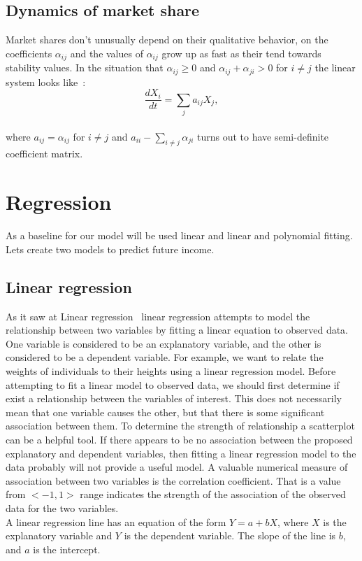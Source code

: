 \subsection{Dynamics of market share} \label{subsec:marketshare}
Market shares don't unusually depend on their qualitative behavior, on the coefficients $\alpha_{ij}$ and the values
of $\alpha_{ij}$ grow up as fast as their tend towards stability values.
In the situation  that $\alpha_{ij} \geq 0$ and $\alpha_{ij} + \alpha_{ji} > 0$ for $i \neq j$ the linear system looks like~\cite{patel}:
\\
\begin{equation} \label{eq:17}
\frac{dX_i}{dt} = \sum_ja_{ij}X_j,
\end{equation}
\\
where $a_{ij} = \alpha_{ij}$ for $i \neq j$ and $a_{ii} - \sum_{i \neq j}\alpha_{ji}$ turns out to have semi-definite
coefficient matrix.

\section{Regression} \label{sec:regression}
As a baseline for our model will be used linear and linear and polynomial fitting.
Lets create two models to predict future income.\\
\subsection{Linear regression} \label{sec:linear}
As it saw at Linear regression~\cite{linear} linear regression attempts to model the relationship between two variables by fitting a linear equation to observed data.
One variable is considered to be an explanatory variable, and the other is considered to be a dependent variable.
For example, we want to relate the weights of individuals to their heights using a linear regression model.
Before attempting to fit a linear model to observed data, we should first determine if exist a relationship between the variables of interest.
This does not necessarily mean that one variable causes the other, but that there is some significant association between them.
To determine the strength of relationship a scatterplot can be a helpful tool.
If there appears to be no association between the proposed explanatory and dependent variables, then fitting a linear regression
model to the data probably will not provide a useful model.
A valuable numerical measure of association between two variables is the correlation coefficient.
That is a value from $<-1, 1>$ range indicates the strength of the association of the observed data for the two variables.\\
A linear regression line has an equation of the form $Y = a + bX$, where $X$ is the explanatory variable and $Y$ is the dependent variable.
The slope of the line is $b$, and $a$ is the intercept.

